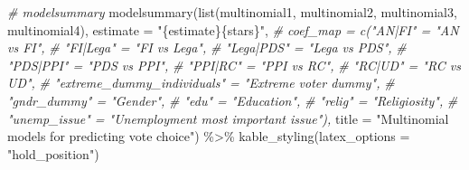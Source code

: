 \documentclass[
]{article}
\newenvironment{Shaded}{\begin{snugshade}}{\end{snugshade}}
\newcommand{\AttributeTok}[1]{\textcolor[rgb]{0.77,0.63,0.00}{#1}}
\newcommand{\CommentTok}[1]{\textcolor[rgb]{0.56,0.35,0.01}{\textit{#1}}}
\newcommand{\FunctionTok}[1]{\textcolor[rgb]{0.00,0.00,0.00}{#1}}
\newcommand{\NormalTok}[1]{#1}
\newcommand{\SpecialCharTok}[1]{\textcolor[rgb]{0.00,0.00,0.00}{#1}}
\newcommand{\StringTok}[1]{\textcolor[rgb]{0.31,0.60,0.02}{#1}}
\begin{document}
\begin{Shaded}
\begin{Highlighting}[]
\CommentTok{\# modelsummary }
\FunctionTok{modelsummary}\NormalTok{(}\FunctionTok{list}\NormalTok{(multinomial1, multinomial2, multinomial3, multinomial4),}
             \AttributeTok{estimate =} \StringTok{"\{estimate\}\{stars\}"}\NormalTok{, }
             \CommentTok{\# coef\_map = c("AN|FI" = "AN vs FI",}
             \CommentTok{\#              "FI|Lega" = "FI vs Lega",}
             \CommentTok{\#              "Lega|PDS" = "Lega vs PDS",}
             \CommentTok{\#              "PDS|PPI" = "PDS vs PPI",}
             \CommentTok{\#              "PPI|RC" = "PPI vs RC",}
             \CommentTok{\#              "RC|UD" = "RC vs UD",}
             \CommentTok{\#              "extreme\_dummy\_individuals" = "Extreme voter dummy",}
             \CommentTok{\#              "gndr\_dummy" = "Gender",}
             \CommentTok{\#              "edu" = "Education",}
             \CommentTok{\#              "relig" = "Religiosity",}
             \CommentTok{\#              "unemp\_issue" = "Unemployment most important issue"),}
             \AttributeTok{title =} \StringTok{"Multinomial models for predicting vote choice"}\NormalTok{) }\SpecialCharTok{\%\textgreater{}\%}
  \FunctionTok{kable\_styling}\NormalTok{(}\AttributeTok{latex\_options =} \StringTok{"hold\_position"}\NormalTok{)}
\end{Highlighting}
\end{Shaded}
\end{document}
